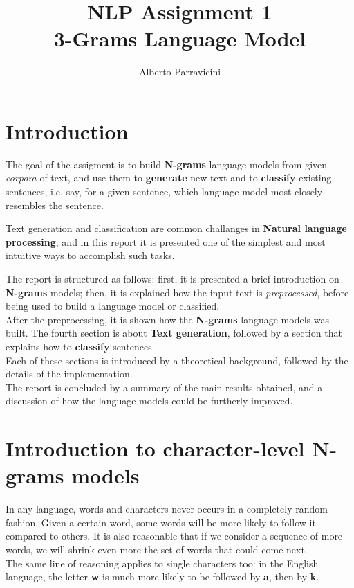 \documentclass[
12pt,
a4paper,
oneside,
headinclude,
footinclude]{article}
\title{\textbf{NLP Assignment 1 \\ 3-Grams Language Model}}
\author{{Alberto Parravicini}}
\date{}	%
\theoremstyle{definition} %
\begin{document}
\maketitle
{}
\setcounter{page}{1}

\section{Introduction}
The goal of the assigment is to build \textbf{N-grams} language models from given \textit{corpora} of text, and use them to \textbf{generate} new text and to \textbf{classify} existing sentences, i.e. say, for a given sentence, which language model most closely resembles the sentence.

Text generation and classification are common challanges in \textbf{Natural language processing}, and in this report it is presented one of the simplest and most intuitive ways to accomplish such tasks.

The report is structured as follows: first, it is presented a brief introduction on \textbf{N-grams} models; then, it is explained how the input text is \textit{preprocessed}, before being used to build a language model or classified. \\
After the preprocessing, it is shown how the \textbf{N-grams} language models was built.
The fourth section is about \textbf{Text generation}, followed by a section that explains how to \textbf{classify} sentences.\\
Each of these sections is introduced by a theoretical background, followed by the details of the implementation.\\
The report is concluded by a summary of the main results obtained, and a discussion of how the language models could be furtherly improved.

\section{Introduction to character-level N-grams models}
In any language, words and characters never occurs in a completely random fashion. Given a certain word, some words will be more likely to follow it compared to others. It is also reasonable that if we consider a sequence of more words, we will shrink even more the set of words that could come next.\\
The same line of reasoning applies to single characters too: in the English language, the letter \textbf{w} is much more likely to be followed by \textbf{a}, then by \textbf{k}.\\
\end{document}
